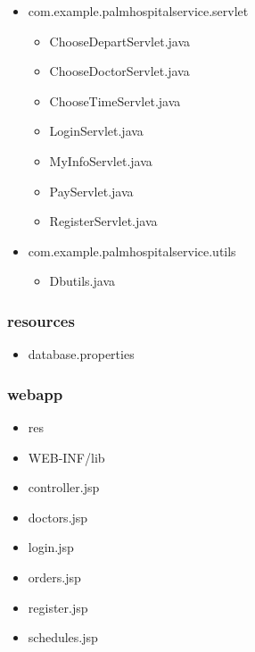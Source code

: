 \documentclass[UTF8,12pt]{article}
\begin{document}
\begin{itemize}
\begin{itemize}
    \end{itemize}
    \item com.example.palmhospitalservice.servlet
    \begin{itemize}
        \item ChooseDepartServlet.java
        \item ChooseDoctorServlet.java
        \item ChooseTimeServlet.java
        \item LoginServlet.java
        \item MyInfoServlet.java
        \item PayServlet.java
        \item RegisterServlet.java
    \end{itemize}
    \item com.example.palmhospitalservice.utils
    \begin{itemize}
        \item Dbutils.java
    \end{itemize}
\end{itemize}
\subsubsection{resources}
\begin{itemize}
    \item database.properties
\end{itemize}

\subsubsection{webapp}
\begin{itemize}
    \item res 
    \item WEB-INF/lib
    \item controller.jsp
    \item doctors.jsp
    \item login.jsp
    \item orders.jsp
    \item register.jsp
    \item schedules.jsp
\end{itemize}

\newpage
\end{document}
